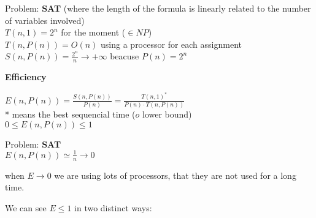 Problem: \textbf{SAT} (where the length of the formula is linearly related to the number of variables involved)\\
$T(n,1) = 2^n$ for the moment ($ \in NP$)\\
$T(n, P(n)) = O(n)$ using a processor for each assignment\\
$S(n, P(n)) = \frac{2^n}{n} \rightarrow +\infty$ beacuse $P(n)=2^n$

\textbf{Efficiency}

$E(n, P(n)) = \frac{S(n, P(n))}{P(n)} = \frac{T(n,1)^*}{P(n) \cdot T(n, P(n))}$\\
* means the best sequencial time ($o$ lower bound)\\
$0 \leq E(n, P(n)) \leq 1$

Problem: \textbf{SAT}\\
$E(n, P(n)) \simeq \frac{1}{n} \rightarrow 0 $
\begin{remark}
 when $E \rightarrow 0$ we are using lots of processors, that they are not used for a long time. 
\end{remark}

We can see $E \leq 1$ in two distinct ways:

